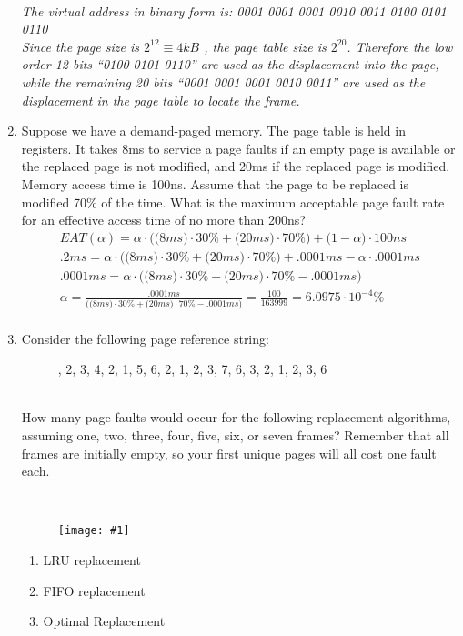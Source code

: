 \documentclass{article}
\newcommand{\answercolor}{Bittersweet}
\newcommand{\answer}[1]{{\\\color{\answercolor}\footnotesize\itshape{#1}}}
\newcommand{\answerimg}[1]{\answer{\begin{figure*}[h]\centering\texttt{[image: \#1]}\end{figure*}}}
\begin{document}
\begin{enumerate}
        \answer{
        The virtual address in binary form is:
            0001 0001 0001 0010 0011 0100 0101 0110\\
        Since the page size is $2^{12} \equiv 4kB$  , the page table size is $2^{20}$. Therefore the low order 12 bits “0100 0101 0110” are used as the displacement into the page, while the remaining 20 bits “0001 0001 0001 0010 0011” are used as the displacement in the page table to locate the frame.
        }
		\item Suppose we have a demand-paged memory. The page table is held in registers. It takes 8ms to service a page faults if an empty page is available or the replaced page is not modified, and 20ms if the replaced page is modified. Memory access time is 100ns. Assume that the page to be replaced is modified 70\% of the time. What is the maximum acceptable page fault rate for an effective access time of no more than 200ns?
        \answer{
            \begin{equation*}
                \begin{gathered}
                    EAT(\alpha)=\alpha\cdot\bigg(\big(8ms\big)\cdot30\%+\big(20ms\big)\cdot70\%\bigg)+\big(1-\alpha\big)\cdot100ns\\
                    .2ms = \alpha\cdot\bigg(\big(8ms\big)\cdot30\%+\big(20ms\big)\cdot70\%\bigg)+.0001ms-\alpha\cdot.0001ms\\
                    .0001ms = \alpha\cdot\bigg(\big(8ms\big)\cdot30\%+\big(20ms\big)\cdot70\%-.0001ms\bigg)\\
                    \alpha = \frac{.0001ms}{\bigg(\big(8ms\big)\cdot30\%+\big(20ms\big)\cdot70\%-.0001ms\bigg)}=\frac{100}{163999}=6.0975\cdot10^{-4}\%\\
                \end{gathered}
            \end{equation*}
        }

		\item Consider the following page reference string:
		\begin{figure*}[h]
			, 2, 3, 4, 2, 1, 5, 6, 2, 1, 2, 3, 7, 6, 3, 2, 1, 2, 3, 6
		\end{figure*}\\
		How many page faults would occur for the following replacement algorithms, assuming one, two, three, four, five, six, or seven frames? Remember that all frames are initially empty, so your first unique pages will all cost one fault each.
        \answerimg{T7Q1}
		\begin{enumerate}
			\item LRU replacement
			\item FIFO replacement
			\item Optimal Replacement


\end{enumerate}
\end{enumerate}
\end{document}
